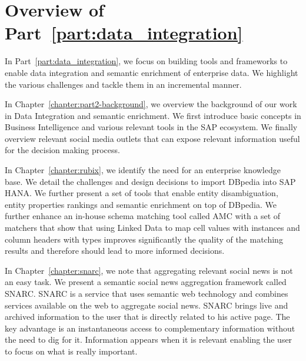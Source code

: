 \chapter*{Overview of Part~\ref{part:data_integration}}

In Part~\ref{part:data_integration}, we focus on building tools and frameworks to enable data integration and semantic enrichment of enterprise data. We highlight the various challenges and tackle them in an incremental manner.

In Chapter~\ref{chapter:part2-background}, we overview the background of our work in Data Integration and semantic enrichment. We first introduce basic concepts in Business Intelligence and various relevant tools in the SAP ecosystem. We finally overview relevant social media outlets that can expose relevant information useful for the decision making process.

In Chapter~\ref{chapter:rubix}, we identify the need for an enterprise knowledge base. We detail the challenges and design decisions to import DBpedia into SAP HANA. We further present a set of tools that enable entity disambiguation, entity properties rankings and semantic enrichment on top of DBpedia. We further enhance an in-house schema matching tool called AMC with a set of matchers that show that using Linked Data to map cell values with instances and column headers with types improves significantly the quality of the matching results and therefore should lead to more informed decisions.

In Chapter~\ref{chapter:snarc}, we note that aggregating relevant social news is not an easy task. We present a semantic social news aggregation framework called SNARC. SNARC is a service that uses semantic web technology and combines services available on the web to aggregate social news. SNARC brings live and archived information to the user that is directly related to his active page. The key advantage is an instantaneous access to complementary information without the need to dig for it. Information appears when it is relevant enabling the user to focus on what is really important.